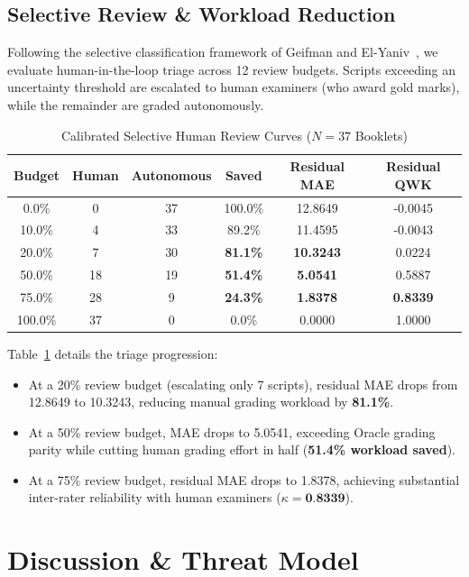 \documentclass[journal]{IEEEtran}
\begin{document}
\subsection{Selective Review & Workload Reduction}
Following the selective classification framework of Geifman and El-Yaniv~\cite{geifman2017selective}, we evaluate human-in-the-loop triage across 12 review budgets. Scripts exceeding an uncertainty threshold are escalated to human examiners (who award gold marks), while the remainder are graded autonomously.

\begin{table}[t]
\centering
\caption{Calibrated Selective Human Review Curves ($N = 37$ Booklets)}
\label{tab:selective_curves}
\begin{tabular}{cccccc}
\toprule
\textbf{Budget} & \textbf{Human} & \textbf{Autonomous} & \textbf{Saved} & \textbf{Residual MAE} & \textbf{Residual QWK} \\
\midrule
0.0\% & 0 & 37 & 100.0\% & 12.8649 & -0.0045 \\
10.0\% & 4 & 33 & 89.2\% & 11.4595 & -0.0043 \\
20.0\% & 7 & 30 & \textbf{81.1\%} & \textbf{10.3243} & 0.0224 \\
50.0\% & 18 & 19 & \textbf{51.4\%} & \textbf{5.0541} & 0.5887 \\
75.0\% & 28 & 9 & \textbf{24.3\%} & \textbf{1.8378} & \textbf{0.8339} \\
100.0\% & 37 & 0 & 0.0\% & 0.0000 & 1.0000 \\
\bottomrule
\end{tabular}
\end{table}

Table~\ref{tab:selective_curves} details the triage progression:
\begin{itemize}
    \item At a 20\% review budget (escalating only 7 scripts), residual MAE drops from 12.8649 to 10.3243, reducing manual grading workload by \textbf{81.1\%}.
    \item At a 50\% review budget, MAE drops to 5.0541, exceeding Oracle grading parity while cutting human grading effort in half (\textbf{51.4\% workload saved}).
    \item At a 75\% review budget, residual MAE drops to 1.8378, achieving substantial inter-rater reliability with human examiners ($\kappa = \textbf{0.8339}$).
\end{itemize}

\section{Discussion \& Threat Model}
\end{document}
